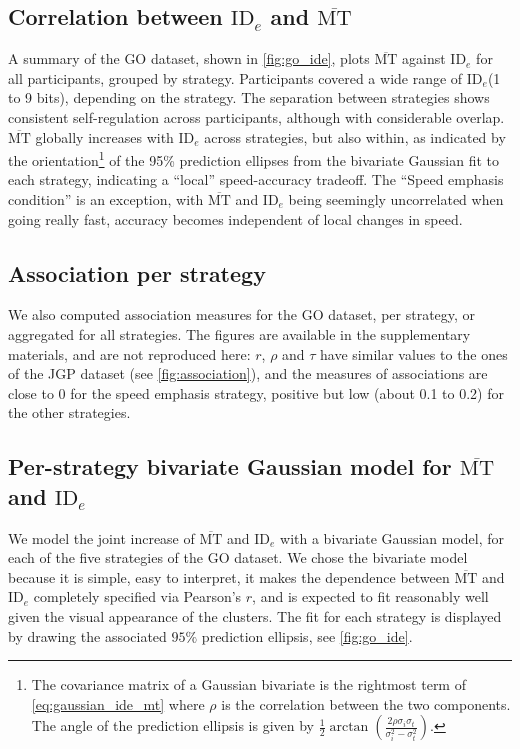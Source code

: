 \documentclass[manuscript,review,anonymous]{acmart}
\newcommand{\mmt}{\ensuremath{\overline{\text{MT}}}\xspace}
\newcommand{\ide}{\ensuremath{{\text{ID}_e}}\xspace}
\begin{document}
\subsection{Correlation between \ide and \mmt}

A summary of the GO dataset, shown in \autoref{fig:go_ide}, plots \mmt against \ide for all participants, grouped by strategy. Participants covered a wide range of \ide (1 to 9 bits), depending on the strategy. The separation between strategies shows consistent self-regulation across participants, although with considerable overlap. \mmt globally increases with \ide across strategies, but also within, as indicated by the orientation\footnote{The covariance matrix of a Gaussian bivariate is the rightmost term of \autoref{eq:gaussian_ide_mt} where $\rho$ is the correlation between the two components. The angle of the prediction ellipsis is given by $\frac{1}{2} \arctan \left( \frac{2\rho \sigma_i\sigma_t}{\sigma_i^2 - \sigma_t^2} \right) $.} of the 95\% prediction ellipses from the bivariate Gaussian fit to each strategy, indicating a ``local'' speed-accuracy tradeoff. The ``Speed emphasis condition'' is an exception, with \mmt and \ide being seemingly uncorrelated \ie when going really fast, accuracy becomes independent of local changes in speed.



\subsection{Association per strategy}
We also computed association measures for the GO dataset, per strategy, or aggregated for all strategies. The figures are available in the supplementary materials, and are not reproduced here: $r$, $\rho$ and $\tau$ have similar values to the ones of the JGP dataset (see \autoref{fig:association}), and the measures of associations are close to 0 for the speed emphasis strategy, positive but low (about 0.1 to 0.2) for the other strategies.

\subsection{Per-strategy bivariate Gaussian model for \mmt and \ide}
We model the joint increase of \mmt and \ide with a bivariate Gaussian model, for each of the five strategies of the GO dataset. We chose the bivariate model because it is simple, easy to interpret, it makes the dependence between \mmt and \ide completely specified via Pearson's $r$, and is expected to fit reasonably well given the visual appearance of the clusters. The fit for each strategy is displayed by drawing the associated $95\%$ prediction ellipsis, see \autoref{fig:go_ide}.
\end{document}
